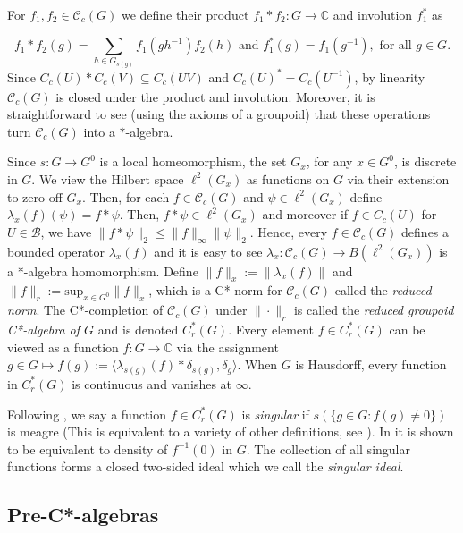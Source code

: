 \documentclass[a4paper, 12pt]{amsart}
\theoremstyle{definition}
\theoremstyle{remark}
\numberwithin{equation}{section}
\begin{document}
For $f_{1},f_{2}\in \mathscr{C}_{c}(G)$ we define their product $f_{1}*f_{2}:G\to \mathbb{C}$ and involution $f_{1}^{*}$ as 

\begin{equation*}
    f_{1}*f_{2}(g) = \sum_{h\in G_{s(g)}}f_{1}(gh^{-1})f_{2}(h) \text{ and }f_{1}^{*}(g) = \overline{f_{1}}(g^{-1}), \text{ for all }g\in G.
\end{equation*} Since $C_{c}(U)*C_{c}(V)\subseteq C_{c}(UV)$ and $C_{c}(U)^{*} = C_{c}(U^{-1})$, by linearity $\mathscr{C}_{c}(G)$ is closed under the product and involution. Moreover, it is straightforward to see (using the axioms of a groupoid) that these operations turn $\mathscr{C}_{c}(G)$ into a $*$-algebra.

Since $s:G\to G^{0}$ is a local homeomorphism, the set $G_{x}$, for any $x\in G^{0}$, is discrete in $G$. We view the Hilbert space $\ell^{2}(G_{x})$ as functions on $G$ via their extension to zero off $G_{x}$. Then, for each $f\in \mathscr{C}_{c}(G)$ and $\psi\in \ell^{2}(G_x)$ define $\lambda_{x}(f)(\psi) = f*\psi$. Then, $f*\psi\in \ell^{2}(G_{x})$ and moreover if $f\in C_{c}(U)$ for $U\in \mathcal{B}$, we have $\|f*\psi\|_{2}\leq \|f\|_{\infty}\|\psi\|_{2}$. Hence, every $f\in\mathscr{C}_{c}(G)$ defines a bounded operator $\lambda_{x}(f)$ and it is easy to see $\lambda_{x}:\mathscr{C}_{c}(G)\to B(\ell^{2}(G_{x}))$ is a *-algebra homomorphism. Define $\|f\|_{x} := \|\lambda_{x}(f)\|$ and $\|f\|_{r}:=\text{sup}_{x\in G^{0}}\|f\|_{x}$, which is a C*-norm for $\mathscr{C}_{c}(G)$ called the \emph{reduced norm}. The C*-completion of $\mathscr{C}_{c}(G)$ under $\|\cdot\|_{r}$ is called the \emph{reduced groupoid C*-algebra of $G$} and is denoted $C^{*}_{r}(G)$. Every element $f\in C^{*}_{r}(G)$ can be viewed as a function $f:G\to\mathbb{C}$ via the assignment $g\in G\mapsto f(g):= \langle \lambda_{s(g)}(f)*\delta_{s(g)}, \delta_{g}\rangle$. When $G$ is Hausdorff, every function in $C^{*}_{r}(G)$ is continuous and vanishes at $\infty$.

Following \cite{KM21}, we say a function $f\in C^{*}_{r}(G)$ is \emph{singular} if $s(\{g\in G: f(g)\neq 0\})$ is meagre (This is equivalent to a variety of other definitions, see \cite[Proposition~7.18]{KM21}). In \cite[Lemma~4.1]{BGHL25} it is shown to be equivalent to density of $f^{-1}(0)$ in $G$. The collection of all singular functions forms a closed two-sided ideal which we call the \emph{singular ideal}.

\subsection{Pre-C*-algebras}
\end{document}
